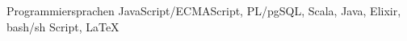 \cvitem
{
  Programmier\-sprachen
}
{
  JavaScript/ECMAScript, PL/pgSQL, Scala, Java, Elixir, bash/sh Script, \LaTeX
}
